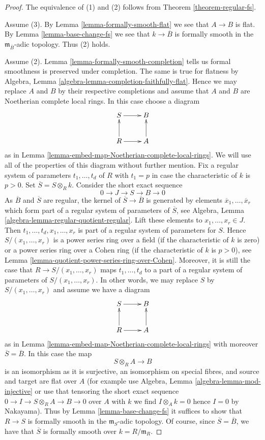 \documentclass[10pt,a4paper]{amsart}
\theoremstyle{plain}
\theoremstyle{definition}
\theoremstyle{remark}
\numberwithin{equation}{subsection}
\begin{document}
\begin{proof}
The equivalence of (1) and (2) follows from Theorem \ref{theorem-regular-fs}.

\medskip\noindent
Assume (3). By Lemma \ref{lemma-formally-smooth-flat} we see that
$A \to B$ is flat. By Lemma \ref{lemma-base-change-fs} we see that
$k \to \overline{B}$ is formally smooth in the
$\mathfrak m_{\overline{B}}$-adic topology. Thus (2) holds.

\medskip\noindent
Assume (2). Lemma \ref{lemma-formally-smooth-completion}
tells us formal smoothness is preserved under completion. The same is true
for flatness by Algebra, Lemma \ref{algebra-lemma-completion-faithfully-flat}.
Hence we may replace $A$ and $B$ by their respective completions and
assume that $A$ and $B$ are Noetherian complete local rings.
In this case choose a diagram
$$
\xymatrix{
S \ar[r] & B \\
R \ar[u] \ar[r] & A \ar[u]
}
$$
as in Lemma \ref{lemma-embed-map-Noetherian-complete-local-rings}.
We will use all of the properties of this diagram without further mention.
Fix a regular system of parameters $t_1, \ldots, t_d$ of $R$
with $t_1 = p$ in case the characteristic of $k$ is $p > 0$.
Set $\overline{S} = S \otimes_R k$. Consider the short exact sequence
$$
0 \to J \to S \to B \to 0
$$
As $\overline{B}$ and $\overline{S}$ are regular, the kernel of
$\overline{S} \to \overline{B}$ is generated by elements
$\overline{x}_1, \ldots, \overline{x}_r$ which form part of a regular
system of parameters of $\overline{S}$, see
Algebra, Lemma \ref{algebra-lemma-regular-quotient-regular}.
Lift these elements to $x_1, \ldots, x_r \in J$. Then
$t_1, \ldots, t_d, x_1, \ldots, x_r$ is part of a regular system of
parameters for $S$. Hence $S/(x_1, \ldots, x_r)$ is a power
series ring over a field (if the characteristic of $k$ is zero)
or a power series ring over a Cohen ring (if the characteristic of
$k$ is $p > 0$), see
Lemma \ref{lemma-quotient-power-series-ring-over-Cohen}.
Moreover, it is still the case that $R \to S/(x_1, \ldots, x_r)$
maps $t_1, \ldots, t_d$ to a part of a regular system of parameters
of $S/(x_1, \ldots, x_r)$. In other words, we may replace $S$ by
$S/(x_1, \ldots, x_r)$ and assume we have a diagram
$$
\xymatrix{
S \ar[r] & B \\
R \ar[u] \ar[r] & A \ar[u]
}
$$
as in Lemma \ref{lemma-embed-map-Noetherian-complete-local-rings}
with moreover $\overline{S} = \overline{B}$. In this case the map
$$
S \otimes_R A \longrightarrow B
$$
is an isomorphism as it is surjective, an isomorphism on special
fibres, and source and target are flat over $A$ (for example use
Algebra, Lemma \ref{algebra-lemma-mod-injective} or use that
tensoring the short exact sequence $0 \to I \to S \otimes_R A \to B \to 0$
over $A$ with $k$ we find $I \otimes_A k = 0$ hence $I = 0$ by Nakayama).
Thus by Lemma \ref{lemma-base-change-fs}
it suffices to show that $R \to S$ is formally
smooth in the $\mathfrak m_S$-adic topology.
Of course, since $\overline{S} = \overline{B}$, we have
that $\overline{S}$ is formally smooth over $k = R/\mathfrak m_R$.


\end{proof}
\end{document}
